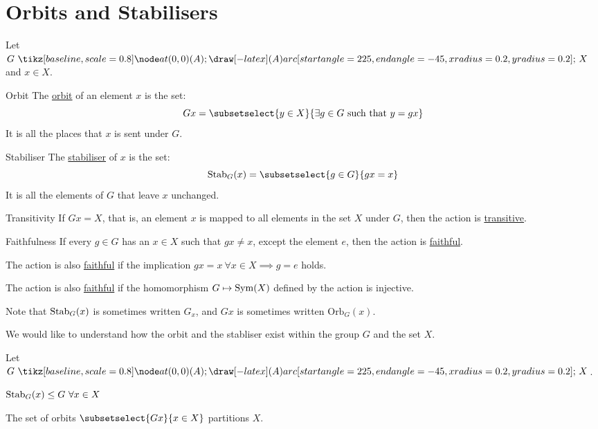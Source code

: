 \documentclass[../Main.tex]{subfiles}
\begin{document}
\section{Orbits and Stabilisers}
Let $G \actson X$ and $x \in X$.
\begin{definition}{Orbit}
    The \underline{orbit} of an element $x$ is the set:
    \begin{equation}
        Gx = \subsetselect{y \in X}{\exists g \in G \text{ such that } y = gx}
    \end{equation}
    It is all the places that $x$ is sent under $G$.
\end{definition}
\begin{definition}{Stabiliser}
    The \underline{stabiliser} of $x$ is the set:
    \begin{equation}
        \Stab_G(x) = \subsetselect{g \in G}{gx = x}
    \end{equation}
    It is all the elements of $G$ that leave $x$ unchanged.
\end{definition}
\begin{definition}{Transitivity}
    If $Gx = X$, that is, an element $x$ is mapped to all elements in the set $X$ under $G$, then the action is \underline{transitive}.
\end{definition}
\begin{definition}{Faithfulness}
    If every $g \in G$ has an $x \in X$ such that $gx \neq x$, except the element $e$, then the action is \underline{faithful}.\par
    The action is also \underline{faithful} if the implication $gx = x~\forall x \in X \implies g = e$ holds.\par
    The action is also \underline{faithful} if the homomorphism $G \mapsto \operatorname{Sym}(X)$ defined by the action is injective.
\end{definition}
Note that $\operatorname{Stab}_G(x)$ is sometimes written $G_x$, and $Gx$ is sometimes written $\text{Orb}_G(x)$.\par
We would like to understand how the orbit and the stabliser exist within the group $G$ and the set $X$.
\begin{propositions}{
        Let $G \actson X$.
    }
    \item $\operatorname{Stab}_G(x) \leq G~\forall x \in X$ \label{propStabIsSubgroup}
    \item The set of orbits $\subsetselect{Gx}{x \in X}$ partitions $X$. \label{propOrbitsPartition}
\end{propositions}
\end{document}
